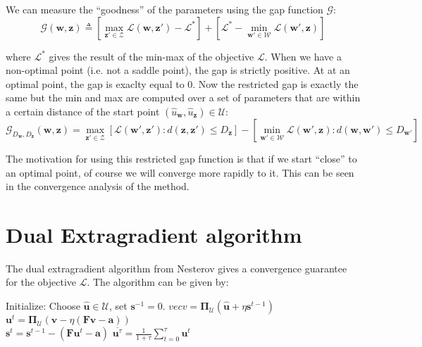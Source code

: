 \documentclass{article}
\renewcommand{\vec}{\mathbf}
\begin{document}
We can measure the ``goodness'' of the parameters using the gap function $\mathcal{G}$:
\begin{equation}
  \mathcal{G}(\vec w, \vec z) \triangleq \left[ \max_{\vec z' \in \mathcal{Z}} \mathcal{L}(\vec w,\vec z') - \mathcal{L}^* \right] + \left[ \mathcal{L}^* - \min_{\vec w' \in \mathcal{W}} \mathcal{L}(\vec w', \vec z) \right]
\end{equation}

where $\mathcal{L}^*$ gives the result of the min-max of the objective $\mathcal{L}$. When we have a non-optimal point (i.e. not a saddle point), the gap is strictly positive. At at an optimal point, the gap is exaclty equal to 0. Now the restricted gap is exactly the same but the min and max are computed over a set of parameters that are within a certain distance of the start point $(\hat{u}_{\vec w},\hat{u}_{\vec z}) \in \mathcal{U}$:
\begin{equation}
  \mathcal{G}_{D_{\vec w}, D_{\vec z}}(\vec w, \vec z) = \max_{\vec z' \in \mathcal{Z}} \left[ \mathcal{L}(\vec w', \vec z') : d(\vec z, \vec z') \leq D_{\vec z} \right] - \left [ \min_{\vec w' \in \mathcal{W}} \mathcal{L}(\vec w', \vec z) : d(\vec w, \vec w') \leq D_{\vec w'} \right ]
\end{equation}

The motivation for using this restricted gap function is that if we start ``close'' to an optimal point, of course we will converge more rapidly to it. This can be seen in the convergence analysis of the method. 


\section{Dual Extragradient algorithm}

The dual extragradient algorithm from Nesterov gives a convergence guarantee for the objective $\mathcal{L}$. The algorithm can be given by:

\begin{algorithmic}
  \STATE Initialize: Choose $\hat{\vec u} \in \mathcal{U}$, set $\vec s^{-1} = 0$.
  \STATE $vec v = \mathbf{\Pi}_{\mathcal{U}}(\hat{\vec u} + \eta \vec s^{t-1})$\\
  \STATE $\vec u^t = \mathbf{\Pi}_{\mathcal{U}}(\vec v - \eta (\vec F \vec v - \vec a))$\\
  \STATE $\vec s^t =  \vec s^{t-1} - (\vec F \vec u^t - \vec a)$
  \ENDFOR
  \RETURN $\overline{\vec u^{\tau}} = \frac{1}{1 + \tau} \sum_{t=0}^{\tau} \vec u^t$
\end{algorithmic}
\end{document}

